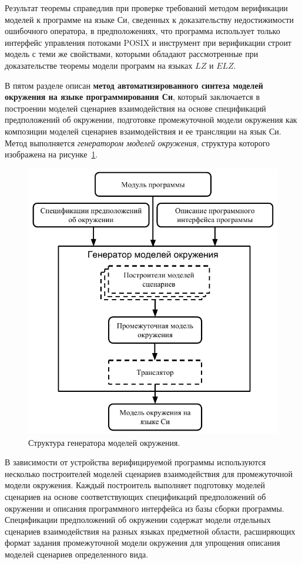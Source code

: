 \documentclass[%
autoref,
colorlinks,  
facsimile,   %
]{disser}
\begin{document}
Результат теоремы справедлив при проверке требований методом верификации моделей к программе на языке Си, сведенных к доказательству недостижимости ошибочного оператора, в предположениях, что программа использует только интерфейс управления потоками POSIX и инструмент при верификации строит модель с теми же свойствами, которыми обладают рассмотренные при доказательстве теоремы модели программ на языках $LZ$ и $ELZ$.

В пятом разделе описан \textbf{метод автоматизированного синтеза моделей окружения на языке программирования Си}, который заключается в построении моделей сценариев взаимодействия на основе спецификаций предположений об окружении, подготовке промежуточной модели окружения как композиции моделей сценариев взаимодействия и ее трансляции на язык Си.
Метод выполняется \textit{генератором моделей окружения}, структура которого изображена на рисунке~\ref{figure:em}.

\begin{figure}
\centering
\includegraphics[scale=0.8]{generators}
\caption{Структура генератора моделей окружения.}
\label{figure:em}
\end{figure}

В зависимости от устройства верифицируемой программы используются несколько построителей моделей сценариев взаимодействия для промежуточной модели окружения.
Каждый построитель выполняет подготовку моделей сценариев на основе соответствующих спецификаций предположений об окружении и описания программного интерфейса из базы сборки программы.
Спецификации предположений об окружении содержат модели отдельных сценариев взаимодействия на разных языках предметной области, расширяющих формат задания промежуточной модели окружения для упрощения описания моделей сценариев определенного вида.
\end{document}
